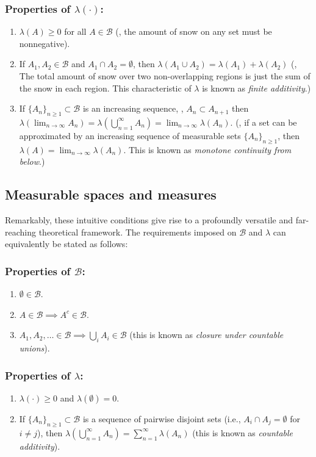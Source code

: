 \subsubsection*{Properties of $\lambda (\cdot)$:}
\begin{enumerate}
    \item  $\lambda(A) \geq 0$ for all $A \in \mathcal{B}$ (\ie, the amount of snow on any set must be nonnegative). 
    \item If $A_1, A_2 \in \mathcal{B}$ and $A_1 \cap A_2 = \emptyset$, then  
    $\lambda(A_1 \cup A_2) = \lambda(A_1) + \lambda(A_2)$
 (\ie, The total amount of snow over two non-overlapping regions is just the sum of the snow in each region. This characteristic of 
$\lambda$ is known as \emph{finite additivity}.)
    \item If $\{A_n\}_{n \geq 1} \subset \mathcal{B}$ is an increasing sequence, \ie, $A_n \subset A_{n+1}$ then  
    $
    \lambda( \lim_{n \to \infty} A_n) = \lambda\left( \bigcup_{n=1}^\infty A_n \right) = \lim_{n \to \infty} \lambda(A_n).
    $
    (\ie, if a set can be approximated by an increasing sequence of measurable sets $\{A_n\}_{n \geq 1}$, then $\lambda(A) = \lim_{n \to \infty} \lambda(A_n)$. This is known as \emph{monotone continuity from below}.)
\end{enumerate}

\subsection{Measurable spaces and measures}
Remarkably, these  intuitive conditions give rise to a profoundly versatile and far-reaching theoretical framework. The requirements imposed on $\mathcal{B}$ and $\lambda$ can equivalently be stated as follows:

\subsubsection*{Properties of $\mathcal{B}$:}
\begin{enumerate}
    \item $\emptyset \in \mathcal{B}$.
    \item $A \in \mathcal{B}  \implies A^c \in \mathcal{B}$. 
    \item  $A_1, A_2, \dots \in \mathcal{B} \implies \bigcup_i A_i \in \mathcal{B}$ (this is known as \emph{closure
 under countable unions}).
\end{enumerate}

\subsubsection*{Properties of $\lambda$:}
\begin{enumerate}
    \item $\lambda(\cdot) \geq 0$  and $\lambda(\emptyset) = 0$.
    \item  If \(\{A_n\}_{n \geq 1} \subset \mathcal{B}\) is a sequence of pairwise disjoint sets (i.e., \(A_i \cap A_j = \emptyset\) for \(i \neq j\)), then
    $\lambda\left( \bigcup_{n=1}^\infty A_n \right) = \sum_{n=1}^\infty \lambda(A_n)$ (this is known as \emph{countable additivity}). 
\end{enumerate}

